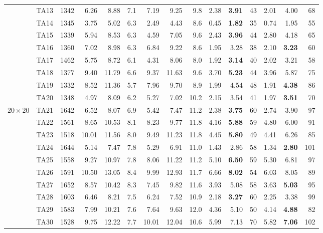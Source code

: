 \documentclass[a4paper,11pt]{article}
\begin{document}
\begin{table}[htbp]
\begin{tabular}{ll r | rr r | rr r | rr r | rr r}
 & TA13 & 1342 & 6.26 & 8.88 & 7.1 & 7.19 & 9.25 & 9.8 & 2.38 & \textbf{3.91} & 43 & 2.01 & 4.00 & 68 \\
 & TA14 & 1345 & 3.75 & 5.02 & 6.3 & 2.49 & 4.43 & 8.6 & 0.45 & \textbf{1.82} & 35 & 0.74 & 1.95 & 55 \\
 & TA15 & 1339 & 5.94 & 8.53 & 6.3 & 4.59 & 7.05 & 9.6 & 2.43 & \textbf{3.96} & 44 & 2.80 & 4.18 & 65 \\
 & TA16 & 1360 & 7.02 & 8.98 & 6.3 & 6.84 & 9.22 & 8.6 & 1.95 & 3.28 & 38 & 2.10 & \textbf{3.23} & 60 \\
 & TA17 & 1462 & 5.75 & 8.72 & 6.1 & 4.31 & 8.06 & 8.0 & 1.92 & \textbf{3.14} & 40 & 2.02 & 3.21 & 58 \\
 & TA18 & 1377 & 9.40 & 11.79 & 6.6 & 9.37 & 11.63 & 9.6 & 3.70 & \textbf{5.23} & 44 & 3.96 & 5.87 & 75 \\
 & TA19 & 1332 & 8.52 & 11.36 & 5.7 & 7.96 & 9.70 & 8.9 & 1.99 & 4.54 & 48 & 1.91 & \textbf{4.38} & 86 \\
 & TA20 & 1348 & 4.97 & 8.09 & 6.2 & 5.27 & 7.02 & 10.2 & 2.15 & 3.54 & 41 & 1.97 & \textbf{3.51} & 70 \\
\hline
$20\times20$ & TA21 & 1642 & 6.52 & 8.07 & 6.9 & 5.42 & 7.47 & 11.2 & 2.38 & \textbf{3.75} & 60 & 2.74 & 3.90 & 97 \\
 & TA22 & 1561 & 8.65 & 10.53 & 8.1 & 8.23 & 9.77 & 11.8 & 4.16 & \textbf{5.88} & 59 & 4.80 & 6.00 & 91 \\
 & TA23 & 1518 & 10.01 & 11.56 & 8.0 & 9.49 & 11.23 & 11.8 & 4.45 & \textbf{5.80} & 49 & 4.41 & 6.26 & 85 \\
 & TA24 & 1644 & 5.14 & 7.47 & 7.8 & 5.29 & 6.91 & 11.0 & 1.43 & 2.86 & 58 & 1.34 & \textbf{2.80} & 101 \\
 & TA25 & 1558 & 9.27 & 10.97 & 7.8 & 8.06 & 11.22 & 11.2 & 5.10 & \textbf{6.50} & 59 & 5.30 & 6.81 & 97 \\
 & TA26 & 1591 & 10.50 & 13.05 & 8.4 & 9.99 & 12.93 & 11.7 & 6.66 & \textbf{8.02} & 54 & 6.03 & 8.05 & 89 \\
 & TA27 & 1652 & 8.57 & 10.42 & 8.3 & 7.45 & 9.82 & 11.6 & 3.93 & 5.08 & 58 & 3.63 & \textbf{5.03} & 95 \\
 & TA28 & 1603 & 6.46 & 8.21 & 7.5 & 6.24 & 7.52 & 10.9 & 2.18 & \textbf{3.27} & 60 & 2.25 & 3.38 & 99 \\
 & TA29 & 1583 & 7.99 & 10.21 & 7.6 & 7.64 & 9.63 & 12.0 & 4.36 & 5.10 & 50 & 4.14 & \textbf{4.88} & 82 \\
 & TA30 & 1528 & 9.75 & 12.22 & 7.7 & 10.01 & 12.04 & 10.6 & 5.99 & 7.13 & 70 & 5.82 & \textbf{7.06} & 102 \\

\end{tabular}
\end{table}
\end{document}
